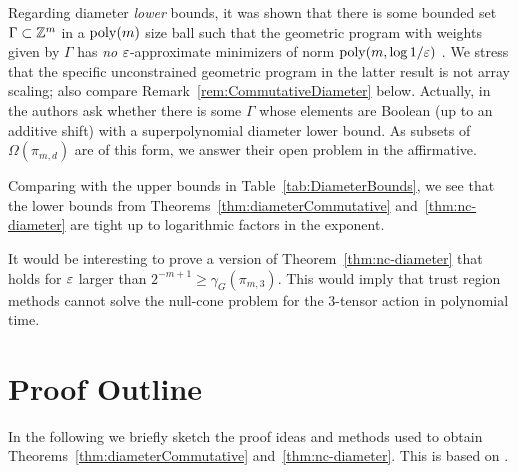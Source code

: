 Regarding diameter \emph{lower} bounds, it was shown that there is some bounded set $\Gamma \subset \mathbb Z^m$ in a $\operatorname{poly}(m)$ size ball such that the geometric program with weights given by $\Gamma$ has \emph{no} $\varepsilon$-approximate minimizers of norm $\operatorname{poly}(m, \log 1/\varepsilon)$ \cite{straszak2019computing}. We stress that the specific unconstrained geometric program in the latter result is not array scaling; also compare Remark~\ref{rem:CommutativeDiameter} below. Actually, in \cite[Section 2.1]{straszak2019computing} the authors ask whether there is some $\Gamma$ whose elements are Boolean (up to an additive shift) with a superpolynomial diameter lower bound. As subsets of $\Omega(\pi_{m,d})$ are of this form, we answer their open problem in the affirmative.

Comparing with the upper bounds in Table~\ref{tab:DiameterBounds}, we see that the lower bounds from Theorems~\ref{thm:diameterCommutative} and~\ref{thm:nc-diameter} are tight up to logarithmic factors in the exponent.

It would be interesting to prove a version of Theorem~\ref{thm:nc-diameter} that holds for $\varepsilon$ larger than $2^{-m+1} \geq \gamma_G(\pi_{m,3})$. This would imply that trust region methods cannot solve the null-cone problem for the $3$-tensor action in polynomial time.




\section{Proof Outline} \label{sec:DiameterProofOutline}

In the following we briefly sketch the proof ideas and methods used to obtain Theorems~\ref{thm:diameterCommutative} and~\ref{thm:nc-diameter}. This is based on \cite[Subsections~3.1 and~4.5]{WeightMargin}.

